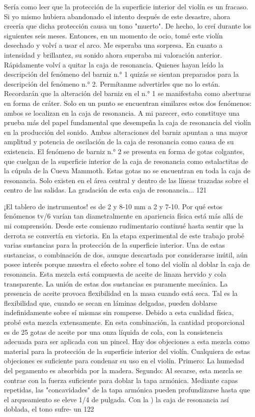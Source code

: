 Sería como leer que la protección de la superficie interior del violín es un fracaso. Si yo mismo hubiera abandonado el intento después de este desastre, ahora creería que dicha protección causa un tono "muerto". De hecho, lo creí durante los siguientes seis meses. Entonces, en un momento de ocio, tomé este violín desechado y volví a usar el arco. Me esperaba una sorpresa. En cuanto a intensidad y brillantez, su sonido ahora superaba mi valoración anterior. Rápidamente volví a quitar la caja de resonancia.
Quienes hayan leído la descripción del fenómeno del barniz n.° 1 quizás se sientan preparados para la descripción del fenómeno n.° 2. Permítanme advertirles que no lo están. Recordarán que la alteración del barniz en el n.° 1 se manifestaba como aberturas en forma de cráter. Solo en un punto se encuentran similares estos dos fenómenos: ambos se localizan en la caja de resonancia. A mi parecer, esto constituye una prueba más del papel fundamental que desempeña la caja de resonancia del violín en la producción del sonido. Ambas alteraciones del barniz apuntan a una mayor amplitud y potencia de oscilación de la caja de resonancia como causa de su existencia.
El fenómeno de barniz n.° 2 se presenta en forma de gotas colgantes, que cuelgan de la superficie interior de la caja de resonancia como estalactitas de la cúpula de la Cueva Mammoth. Estas gotas no se encuentran en toda la caja de resonancia. Solo existen en el área central y dentro de las líneas trazadas sobre el centro de las salidas. La gradación de esta caja de resonancia...
121

¡El tablero de instrumentos! es de 2 y 8-10 mm a 2 y 7-10. Por qué estos fenómenos tv/6 varían tan diametralmente en apariencia física está más allá de mi comprensión.
Desde este comienzo rudimentario continué hasta sentir que la derrota se convertía en victoria. En la etapa experimental de este trabajo probé varias sustancias para la protección de la superficie interior. Una de estas sustancias, o combinación de dos, aunque descartada por considerarse inútil, aún posee interés porque muestra el efecto sobre el tono del violín al doblar la caja de resonancia. Esta mezcla está compuesta de aceite de linaza hervido y cola transparente. La unión de estas dos sustancias es puramente mecánica. La presencia de aceite provoca flexibilidad en la masa cuando está seca. Tal es la flexibilidad que, cuando se secan en láminas delgadas, pueden doblarse indefinidamente sobre sí mismas sin romperse. Debido a esta cualidad física, probé esta mezcla extensamente. En esta combinación, la cantidad proporcional es de 25 gotas de aceite por una onza líquida de cola, con la consistencia adecuada para ser aplicada con un pincel.
Hay dos objeciones a esta mezcla como material para la protección de la superficie interior del violín. Cualquiera de estas objeciones es suficiente para condenar su uso en el violín. Primero: La humedad del pegamento es absorbida por la madera. Segundo: Al secarse, esta mezcla se contrae con la fuerza suficiente para doblar la tapa armónica. Mediante capas repetidas, las "concavidades" de la tapa armónica pueden profundizarse hasta que el arqueamiento se eleve 1/4 de pulgada. Con la
) la caja de resonancia así doblada, el tono sufre- un
122

